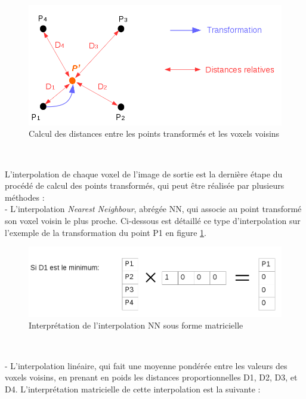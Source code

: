 \documentclass[10pt]{report}
\begin{document}
	\begin{figure}[h!]
		\begin{center}
			\includegraphics[width=12cm]{transform_image.png}	
		\end{center}
		\caption{Calcul des distances entre les points transformés et les voxels voisins}
		\label{Calcul des distances entre les points transformés et les voxels voisins}
	\end{figure}
	~\par 
	\newpage
	L'interpolation de chaque voxel de l'image de sortie est la dernière étape du procédé de calcul des points transformés, qui peut être réalisée par plusieurs méthodes :\\
	- L'interpolation \textit{Nearest Neighbour}, abrégée NN, qui associe au point transformé son voxel voisin le plus proche. Ci-dessous est détaillé ce type d'interpolation sur l'exemple de la transformation du point P1 en figure \ref{Calcul des distances entre les points transformés et les voxels voisins}.\\
	\begin{figure}[h!]
		\begin{center}
			\includegraphics[width=12cm]{calcul_interp_nn.png}	
		\end{center}
		\caption{Interprétation de l'interpolation NN sous forme matricielle}
		\label{Interprétation de l'interpolation NN sous forme matricielle}
	\end{figure}
	~\par 
	- L'interpolation linéaire, qui fait une moyenne pondérée entre les valeurs des voxels voisins, en prenant en poids les distances proportionnelles D1, D2, D3, et D4. L'interprétation matricielle de cette interpolation est la suivante :
\end{document}
